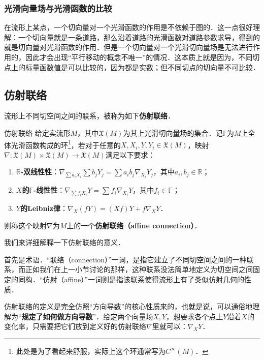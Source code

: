 \subsubsection{光滑向量场与光滑函数的比较}

在流形上某点，一个切向量对一个光滑函数的作用是不依赖于图的．这一点很好理解：一个切向量就是一条道路，那么沿着道路的光滑函数对道路参数求导，得到的就是切向量对光滑函数的作用．但是一个切向量对一个光滑切向量场是无法进行作用的，因此才会出现“平行移动的概念不唯一”的情况．这本质上就是因为，不同切点上的标量函数值是可以比较的，因为都是实数；但不同切点的切向量不可比较．


\subsection{仿射联络}

流形上不同切空间之间的联系，被称为如下\textbf{仿射联络}．

\begin{definition}{仿射联络}
给定实流形$M$，其中$\mathfrak{X}(M)$为其上光滑切向量场的集合．记$\mathbb{F}$为$M$上全体光滑函数构成的环\footnote{此处是为了看起来舒服，实际上这个环通常写为$C^\infty(M)$．}，若对于任意的$X, X_i, Y, Y_i\in\mathfrak{X}(M)$，映射$\nabla:\mathfrak{X}(M)\times\mathfrak{X}(M)\to\mathfrak{X}(M)$满足以下要求：
\begin{enumerate}
\item \textbf{$\mathbb{R}$-双线性性}：$\nabla_{\sum a_iX_i}\sum b_jY_j=\sum a_ib_j\nabla_{X_i}Y_j$，其中$a_i, b_j\in\mathbb{R}$；
\item \textbf{$X$的$\mathbb{F}$-线性性}：$\nabla_{\sum f_iX_i}Y=\sum f_i\nabla_{X_i}Y$，其中$f_i\in\mathbb{F}$；
\item \textbf{$Y$的Leibniz律}：$\nabla_X(fY)=(Xf)Y+f\nabla_XY$．
\end{enumerate}
则称这个映射$\nabla$为$M$上的一个\textbf{仿射联络（affine connection）}．
\end{definition}

我们来详细解释一下仿射联络的意义．

首先是术语．“联络（connection）”一词，是指它建立了不同切空间之间的一种联系，而正如我们在上一小节讨论的那样，这种联系没法简单地定义为切空间之间固定的同构．“仿射（affine）”一词则是指该联系使得流形上有了类似仿射几何的性质．

仿射联络的定义是完全仿照“方向导数”的核心性质来的，也就是说，可以通俗地理解为“\textbf{规定了如何做方向导数}”．给定两个向量场$X, Y$，想要求各个点上$Y$沿着$X$的变化率，只需要把它们放到定义好的仿射联络$\nabla$里就可以：$\nabla_XY$．

